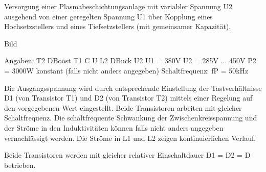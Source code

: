 







Versorgung einer Plasmabeschichtungsanlage mit variabler Spannung U2 ausgehend von einer
geregelten Spannung U1 über Kopplung eines Hochsetzstellers und eines Tiefsetzstellers (mit
gemeinsamer Kapazität).


Bild


Angaben:
T2
DBoost
T1
C
U
L2
DBuck
U2
U1 = 380V
U2 = 285V ... 450V
P2 = 3000W konstant (falls nicht anders angegeben)
Schaltfrequenz: fP = 50kHz


Die Ausgangsspannung wird durch entsprechende Einstellung der Tastverhältnisse D1 (von Transistor
T1) und D2 (von Transistor T2) mittels einer Regelung auf den vorgegebenen Wert eingestellt. Beide
Transistoren arbeiten mit gleicher Schaltfrequenz. Die schaltfrequente Schwankung der
Zwischenkreisspannung und der Ströme in den Induktivitäten können falls nicht anders
angegeben vernachlässigt werden. Die Ströme in L1 und L2 zeigen kontinuierlichen Verlauf.

Beide Transistoren werden mit gleicher relativer Einschaltdauer D1 = D2 = D betrieben.


